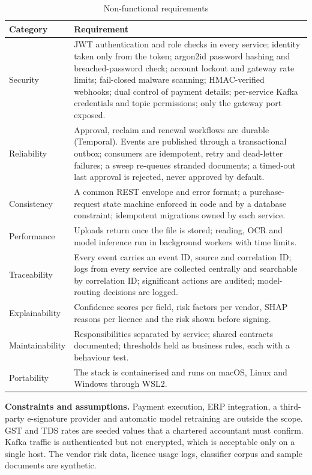 \begin{table}[!htbp]
\centering\tablestyle
\caption{Non-functional requirements}\label{tab:nfr}
\begin{tabularx}{\textwidth}{|L{0.18\textwidth}|Y|}
\hline
\textbf{Category} & \textbf{Requirement} \\ \hline
Security & JWT authentication and role checks in every service; identity taken only from the token; argon2id password hashing and breached-password check; account lockout and gateway rate limits; fail-closed malware scanning; HMAC-verified webhooks; dual control of payment details; per-service Kafka credentials and topic permissions; only the gateway port exposed. \\ \hline
Reliability & Approval, reclaim and renewal workflows are durable (Temporal). Events are published through a transactional outbox; consumers are idempotent, retry and dead-letter failures; a sweep re-queues stranded documents; a timed-out last approval is rejected, never approved by default. \\ \hline
Consistency & A common REST envelope and error format; a purchase-request state machine enforced in code and by a database constraint; idempotent migrations owned by each service. \\ \hline
Performance & Uploads return once the file is stored; reading, OCR and model inference run in background workers with time limits. \\ \hline
Traceability & Every event carries an event ID, source and correlation ID; logs from every service are collected centrally and searchable by correlation ID; significant actions are audited; model-routing decisions are logged. \\ \hline
Explainability & Confidence scores per field, risk factors per vendor, SHAP reasons per licence and the risk shown before signing. \\ \hline
Maintainability & Responsibilities separated by service; shared contracts documented; thresholds held as business rules, each with a behaviour test. \\ \hline
Portability & The stack is containerised and runs on macOS, Linux and Windows through WSL2. \\ \hline
\end{tabularx}
\end{table}

\noindent\textbf{Constraints and assumptions.} Payment execution, ERP integration, a third-party e-signature provider and automatic model retraining are outside the scope. GST and TDS rates are seeded values that a chartered accountant must confirm. Kafka traffic is authenticated but not encrypted, which is acceptable only on a single host. The vendor risk data, licence usage logs, classifier corpus and sample documents are synthetic.

